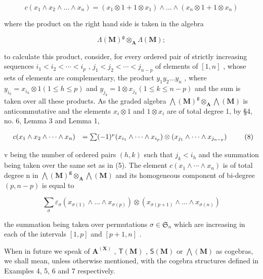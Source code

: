 \[
c \left(x _ {1} \wedge x _ {2} \wedge \dots \wedge x _ {n}\right) = \left(x _ {1} \otimes 1 + 1 \otimes x _ {1}\right) \wedge \dots \wedge \left(x _ {n} \otimes 1 + 1 \otimes x _ {n}\right)
\]

where the product on the right hand side is taken in the algebra

\[
\Lambda (\mathbf {M}) ^ {\mathfrak {g}} \otimes_ {\mathbf {A}} \Lambda (\mathbf {M});
\]

to calculate this product, consider, for every ordered pair of strictly increasing sequences \(i_1 < i_2 < \cdots < i_p\) , \(j_1 < j_2 < \cdots < j_{n-p}\) of elements of \([1, n]\) , whose sets of elements are complementary, the product \(y_1y_2\ldots y_n\) , where \(y_{i_h} = x_{i_h} \otimes 1 (1 \leqslant h \leqslant p)\) and \(y_{j_k} = 1 \otimes x_{j_k} (1 \leqslant k \leqslant n - p)\) and the sum is taken over all these products. As the graded algebra \(\bigwedge (\mathbf{M})^{\mathfrak{g}} \otimes_{\mathbf{A}} \bigwedge (\mathbf{M})\) is anticommutative and the elements \(x_i \otimes 1\) and \(1 \otimes x_i\) are of total degree 1, by §4, no. 6, Lemma 3 and Lemma 1,

\[
\begin{array}{r l} c (x _ {1} \wedge x _ {2} \wedge \dots \wedge x _ {n}) & = \sum (- 1) ^ {\nu} (x _ {i _ {1}} \wedge \dots \wedge x _ {i _ {p}}) \otimes (x _ {j _ {1}} \wedge \dots \wedge x _ {j _ {n - p}}) \end{array} \tag {8}
\]

v being the number of ordered pairs \((h, k)\) such that \(j_{k} < i_{h}\) and the summation being taken over the same set as in (5). The element \(c(x_{1} \wedge \cdots \wedge x_{n})\) is of total degree n in \(\bigwedge(\mathbf{M})^{\mathbf{g}} \otimes_{\mathbf{A}} \bigwedge(\mathbf{M})\) and its homogeneous component of bi-degree \((p, n - p)\) is equal to

\[
\sum_ {\sigma} \varepsilon_ {\sigma} (x _ {\sigma (1)} \wedge \dots \wedge x _ {\sigma (p)}) \otimes (x _ {\sigma (p + 1)} \wedge \dots \wedge x _ {\sigma (n)})\tag{9}
\]

the summation being taken over permutations \(\sigma\in\mathfrak{S}_{n}\) which are increasing in each of the intervals \([1,p]\) and \([p+1,n]\) .

When in future we speak of \(\mathbf{A}^{(\mathbf{X})}\) , \(\mathsf{T}(\mathbf{M})\) , \(\mathsf{S}(\mathbf{M})\) or \(\bigwedge (\mathbf{M})\) as cogebras, we shall mean, unless otherwise mentioned, with the cogebra structures defined in Examples 4, 5, 6 and 7 respectively.


